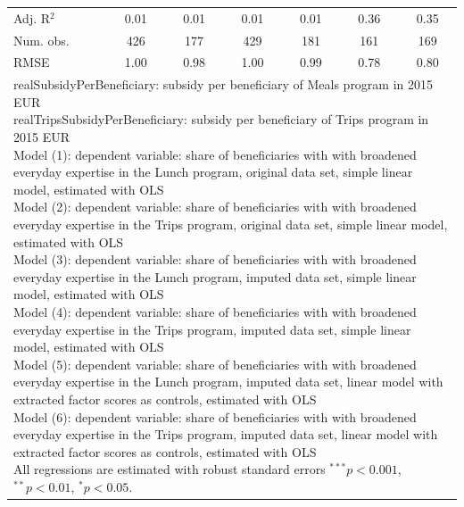 \begin{frame}[fragile]
\begin{table}
\begin{center}
{\begin{tabular}{l c c c c c c }
Adj. R$^2$                     & 0.01     & 0.01     & 0.01     & 0.01     & 0.36         & 0.35         \\
Num. obs.                      & 426      & 177      & 429      & 181      & 161          & 169          \\
RMSE                           & 1.00     & 0.98     & 1.00     & 0.99     & 0.78         & 0.80         \\
\hline
\multicolumn{7}{l}{\scriptsize{\parbox{\linewidth}
{\vspace{2pt} realSubsidyPerBeneficiary: subsidy per beneficiary of Meals program in 2015 EUR \\ realTripsSubsidyPerBeneficiary: subsidy per beneficiary of Trips program in 2015 EUR \\ Model (1): dependent variable: share of beneficiaries with with broadened everyday expertise in the Lunch program, original data set, simple linear model, estimated with OLS \\ Model (2): dependent variable: share of beneficiaries with with broadened everyday expertise in the Trips program, original data set, simple linear model, estimated with OLS \\ Model (3): dependent variable: share of beneficiaries with with broadened everyday expertise in the Lunch program, imputed data set, simple linear model, estimated with OLS \\ Model (4): dependent variable: share of beneficiaries with with broadened everyday expertise in the Trips program, imputed data set, simple linear model, estimated with OLS\\ Model (5): dependent variable: share of beneficiaries with with broadened everyday expertise in the Lunch program, imputed data set, linear model with extracted factor scores as controls, estimated with OLS \\ Model (6): dependent variable: share of beneficiaries with with broadened everyday expertise in the Trips program, imputed data set, linear model with extracted factor scores as controls, estimated with OLS \\ All regressions are estimated with robust standard errors $^{***}p<0.001$, $^{**}p<0.01$, $^*p<0.05$.}}}
\end{tabular}
}
\label{DayToDaySkillsRegressions}
\end{center}
\end{table}


\end{frame}

